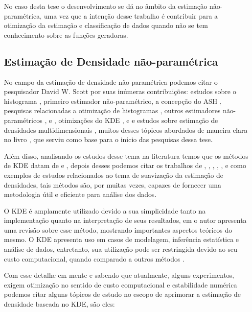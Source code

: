 No caso desta tese o desenvolvimento se dá no âmbito da estimação não-paramétrica, uma vez que a intenção desse trabalho é contribuir para a otimização da estimação e classificação de dados quando não se tem conhecimento sobre as funções geradoras.

\subsection{Estimação de Densidade não-paramétrica}

No campo da estimação de densidade não-paramétrica podemos citar o pesquisador David W. Scott por suas inúmeras contribuições: estudos sobre o histograma \cite{histogramScott}, primeiro estimador não-paramétrico, a concepção do \ac{ASH} \cite{ashScott}, pesquisas relacionadas a otimização de histogramas \cite{scott1979optimal}, outros estimadores não-paramétricos \cite{scott1987biased}, \cite{scott1981monte} e \cite{wang19941}, otimizações do \ac{KDE} \cite{terrell1992variable}, \cite{scott1977kernel} e \cite{scott1985kernel} e estudos sobre estimação de densidades multidimensionais \cite{sain1994cross}, muitos desses tópicos abordados de maneira clara no livro \cite{scott2015multivariate}, que serviu como base para o início das pesquisas dessa tese.

Além disso, analisando os estudos desse tema na literatura temos que os métodos de \ac{KDE} datam de \cite{rosenblatt1956remarks} e \cite{parzen1962estimation}, depois desses podemos citar os trabalhos de  \cite{eubank1988spline}, \cite{hardle1990applied}, \cite{hardle1988smoothing}, \cite{silverman1986density}, \cite{wahba1990spline}, \cite{wand1994kernel} e \cite{jones1996brief} como exemplos de estudos relacionados ao tema de suavização da estimação de densidades, tais métodos são, por muitas vezes, capazes de fornecer uma metodologia útil e eficiente para análise dos dados.

O \ac{KDE} é amplamente utilizado devido a sua simplicidade tanto na implementação quanto na interpretação de seus resultados, em \cite{zambom2012review} o autor apresenta uma revisão sobre esse método, mostrando importantes aspectos teóricos do mesmo. O \ac{KDE} apresenta uso em casos de modelagem, inferência estatística e análise de dados, entretanto, sua utilização pode ser restringida devido ao seu custo computacional, quando comparado a outros métodos \cite{tang2016fast}. 

Com esse detalhe em mente e sabendo que atualmente, alguns experimentos, exigem otimização no sentido de custo computacional e estabilidade numérica podemos citar alguns tópicos de estudo no escopo de aprimorar a estimação de densidade baseada no \ac{KDE}, são eles:


